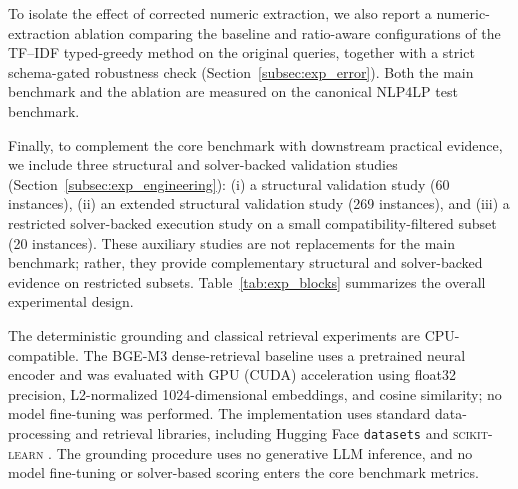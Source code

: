 \documentclass[pdflatex,sn-basic,Numbered]{sn-jnl}
\begin{document}
To isolate the effect of corrected numeric extraction, we also report a numeric-extraction ablation comparing the baseline and ratio-aware configurations of the TF--IDF typed-greedy method on the original queries, together with a strict schema-gated robustness check (Section~\ref{subsec:exp_error}). Both the main benchmark and the ablation are measured on the canonical \textsc{NLP4LP} test benchmark.

Finally, to complement the core benchmark with downstream practical evidence, we include three structural and solver-backed validation studies (Section~\ref{subsec:exp_engineering}): (i) a structural validation study (60 instances), (ii) an extended structural validation study (269 instances), and (iii) a restricted solver-backed execution study on a small compatibility-filtered subset (20 instances). These auxiliary studies are not replacements for the main benchmark; rather, they provide complementary structural and solver-backed evidence on restricted subsets. Table~\ref{tab:exp_blocks} summarizes the overall experimental design.

The deterministic grounding and classical retrieval experiments are CPU-compatible. The BGE-M3 dense-retrieval baseline uses a pretrained neural encoder and was evaluated with GPU (CUDA) acceleration using float32 precision, L2-normalized 1024-dimensional embeddings, and cosine similarity; no model fine-tuning was performed. The implementation uses standard data-processing and retrieval libraries, including Hugging Face \texttt{datasets} \cite{lhoest2021datasets} and \textsc{scikit-learn} \cite{pedregosa2011sklearn}. The grounding procedure uses no generative LLM inference, and no model fine-tuning or solver-based scoring enters the core benchmark metrics.
\end{document}
